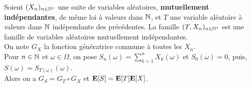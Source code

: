 \begin{prop}{}
    Soient $(X_n)_{n \in \mathbb{N}^\star}$ une suite de variables aléatoires, \textbf{mutuellement indépendantes}, de même loi à valeurs dans $\mathbb{N}$, et $T$ une variable aléatoire à valeurs dans $\mathbb{N}$ indépendante des précédentes. La famille $(T, X_n)_{n \in \mathbb{N}^\star}$ est une famille de variables aléatoires mutuellement indépendantes.\\
    On note $G_X$ la fonction génératrice commune à toutes les $X_n$.\\
    Pour $n \in \mathbb{N}$ et $\omega \in \Omega$, on pose $S_n(\omega) = \sum\limits_{k=1}^{n} X_k(\omega)$ et $S_0(\omega) = 0$, puis, $S(\omega) = S_{T(\omega)}(\omega)$.\\
    Alors on a $G_S = G_T \circ G_X$ et $\mathbf{E}[S] = \mathbf{E}[T] \mathbf{E}[X]$.
\end{prop}
